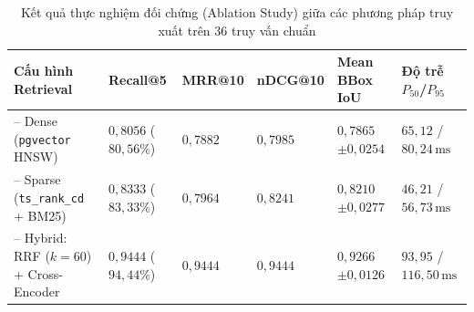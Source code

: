 \begin{table}[!htbp]
\centering
\setlength{\tabcolsep}{5pt}
\renewcommand{\arraystretch}{1.20}
\caption{Kết quả thực nghiệm đối chứng (Ablation Study) giữa các phương pháp truy xuất trên 36 truy vấn chuẩn}
\label{tab:ablation_retrieval}
\begin{tabularx}{\textwidth}{|>{\raggedright\arraybackslash}X|>{\centering\arraybackslash}m{2.0cm}|>{\centering\arraybackslash}m{2.1cm}|>{\centering\arraybackslash}m{2.2cm}|>{\centering\arraybackslash}m{2.2cm}|>{\centering\arraybackslash}m{2.1cm}|}
\hline
\centering\textbf{Cấu hình Retrieval} & \textbf{Recall@5} & \textbf{MRR@10} & \textbf{nDCG@10} & \textbf{Mean BBox} \newline \textbf{IoU} & \textbf{Độ trễ} \newline \textbf{$P_{50}$/$P_{95}$} \tabularnewline \hline
-- Dense (\texttt{pgvector} HNSW) & $0{,}8056$ ($80{,}56\%$) & $0{,}7882$ & $0{,}7985$ & $0{,}7865$ \newline $\pm 0{,}0254$ & $65{,}12$ / \newline $80{,}24\,\text{ms}$ \\ \hline
-- Sparse (\texttt{ts\_\allowbreak rank\_\allowbreak cd} + BM25) & $0{,}8333$ ($83{,}33\%$) & $0{,}7964$ & $0{,}8241$ & $0{,}8210$ \newline $\pm 0{,}0277$ & $46{,}21$ / \newline $56{,}73\,\text{ms}$ \\ \hline
-- Hybrid: RRF ($k=60$) + Cross-Encoder & $0{,}9444$ ($94{,}44\%$) & $0{,}9444$ & $0{,}9444$ & $0{,}9266$ \newline $\pm 0{,}0126$ & $93{,}95$ / \newline $116{,}50\,\text{ms}$ \\ \hline
\end{tabularx}
\end{table}

